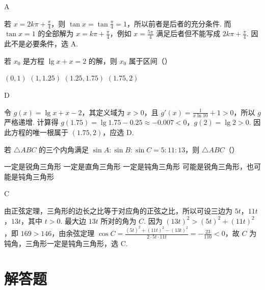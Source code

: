 \begin{answer}
A
\end{answer}

\begin{solution}
若 \(x=2k\pi+\frac{\pi}{4}\)，则 \(\tan x=\tan\frac{\pi}{4}=1\)，所以前者是后者的充分条件.
而 \(\tan x=1\) 的全部解为 \(x=k\pi+\frac{\pi}{4}\)，例如 \(x=\frac{5\pi}{4}\) 满足后者但不能写成 \(2k\pi+\frac{\pi}{4}\). 因此不是必要条件，选 A.
\end{solution}

\begin{problem}
若 \(x_0\) 是方程 \(\lg x + x = 2\) 的解，则 \(x_0\) 属于区间（\quad）

\choices
    {\((0,1)\)}
    {\((1, 1.25)\)}
    {\((1.25, 1.75)\)}
    {\((1.75, 2)\)}
\end{problem}

\begin{answer}
D
\end{answer}

\begin{solution}
令 \(g(x)=\lg x+x-2\)，其定义域为 \(x>0\)，且 \(g'(x)=\frac{1}{x\ln10}+1>0\)，所以 \(g\) 严格递增.
计算得 \(g(1.75)=\lg1.75-0.25\approx-0.007<0\)，\(g(2)=\lg2>0\). 因此方程的唯一根属于 \((1.75,2)\)，应选 D.
\end{solution}

\begin{problem}
若 \(\triangle ABC\) 的三个内角满足 \(\sin A: \sin B: \sin C = 5:11:13\)，则 \(\triangle ABC\)（\quad）

\choices
    {一定是锐角三角形}
    {一定是直角三角形}
    {一定是钝角三角形}
    {可能是锐角三角形，也可能是钝角三角形}
\end{problem}

\begin{answer}
C
\end{answer}

\begin{solution}
由正弦定理，三角形的边长之比等于对应角的正弦之比，所以可设三边为 \(5t\)，\(11t\)，\(13t\)，其中 \(t>0\). 最大边 \(13t\) 所对的角为 \(C\). 因为
\((13t)^2>(5t)^2+(11t)^2\)，即 \(169>146\)，由余弦定理
\(\cos C=\frac{(5t)^2+(11t)^2-(13t)^2}{2\cdot5t\cdot11t}=-\frac{23}{110}<0\)，故 \(C\) 为钝角，三角形一定是钝角三角形，选 C.
\end{solution}

\section{解答题}

